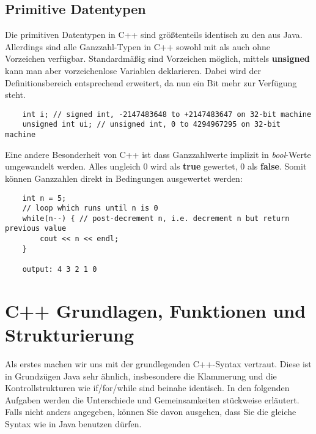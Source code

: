 \documentclass[
  accentcolor=tud1c,	%
  colorbacktitle,		%
  inverttitle,			%
  german,				%
  twoside
]{tudexercise}
\begin{document}
\subsection{Primitive Datentypen}
Die primitiven Datentypen in C++ sind größtenteils identisch zu den aus Java. Allerdings sind alle Ganzzahl-Typen in C++ sowohl mit als auch ohne Vorzeichen verfügbar. Standardmäßig sind Vorzeichen möglich, mittels \textbf{unsigned} kann man aber vorzeichenlose Variablen deklarieren. Dabei wird der Definitionsbereich entsprechend erweitert, da nun ein Bit mehr zur Verfügung steht.

\begin{lstlisting}
 	int i; // signed int, -2147483648 to +2147483647 on 32-bit machine
	unsigned int ui; // unsigned int, 0 to 4294967295 on 32-bit machine
\end{lstlisting}

Eine andere Besonderheit von C++ ist dass Ganzzahlwerte implizit in \emph{bool}-Werte umgewandelt werden. Alles ungleich 0 wird als \textbf{true} gewertet, 0 als \textbf{false}. Somit können Ganzzahlen direkt in Bedingungen ausgewertet werden:

\begin{lstlisting}
 	int n = 5;
 	// loop which runs until n is 0
 	while(n--) { // post-decrement n, i.e. decrement n but return previous value
  		cout << n << endl;
 	}

	output: 4 3 2 1 0
\end{lstlisting}


\section{C++ Grundlagen, Funktionen und Strukturierung}

Als erstes machen wir uns mit der grundlegenden C++-Syntax vertraut. Diese ist in Grundzügen Java sehr ähnlich, insbesondere die Klammerung und die Kontrollstrukturen wie if/for/while sind beinahe identisch. In den folgenden Aufgaben werden die Unterschiede und Gemeinsamkeiten stückweise erläutert. Falls nicht anders angegeben, können Sie davon ausgehen, dass Sie die gleiche Syntax wie in Java benutzen dürfen.
\end{document}
